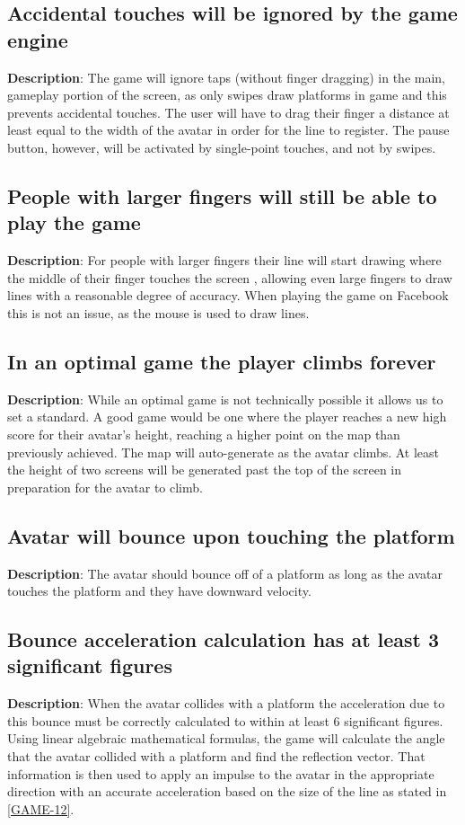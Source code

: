 \subsection{Accidental touches will be ignored by the game engine}
\textbf{Description}: The game will ignore taps (without finger dragging) in
the main, gameplay portion of the screen, as only swipes draw platforms
in game and this prevents accidental touches. The user will have to
drag their finger a distance at least equal to the width of the avatar
in order for the line to register. The pause button, however, will
be activated by single-point touches, and not by swipes.

\subsection{People with larger fingers will still be able to play the game}
\textbf{Description}: For people with larger fingers their line will start
drawing where the middle of their finger touches the screen , allowing
even large fingers to draw lines with a reasonable degree of accuracy.
When playing the game on Facebook this is not an issue, as the mouse
is used to draw lines. 

\subsection{In an optimal game the player climbs forever}
\textbf{Description}: While an optimal game is not technically possible it
allows us to set a standard. A good game would be one where the player
reaches a new high score for their avatar\textquoteright{}s height,
reaching a higher point on the map than previously achieved. The map
will auto-generate as the avatar climbs. At least the height of two
screens will be generated past the top of the screen in preparation
for the avatar to climb.

\subsection{Avatar will bounce upon touching the platform}
\textbf{Description}: The avatar should bounce off of a platform as long as
the avatar touches the platform and they have downward velocity.

\subsection{Bounce acceleration calculation has at least 3 significant figures}
\textbf{Description}: When the avatar collides with a platform the acceleration
due to this bounce must be correctly calculated to within at least
6 significant figures. Using linear algebraic mathematical formulas,
the game will calculate the angle that the avatar collided with a
platform and find the reflection vector. That information is then
used to apply an impulse to the avatar in the appropriate direction
with an accurate acceleration based on the size of the line as stated
in \ref{GAME-12}.

